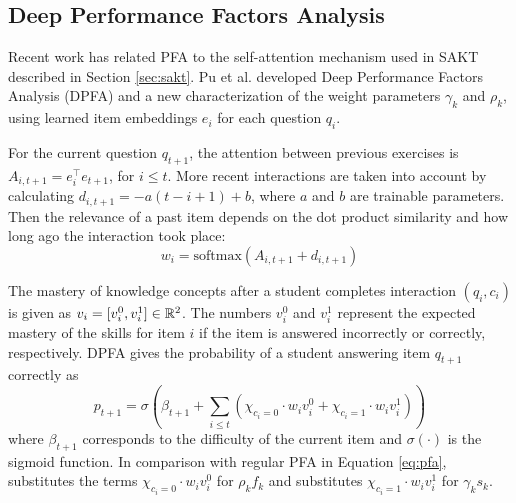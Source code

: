 \subsection{Deep Performance Factors Analysis}
Recent work has related PFA to the self-attention mechanism used in SAKT described in Section \ref{sec:sakt}. Pu et al. \cite{deep_pfa} developed Deep Performance Factors Analysis (DPFA) and a new characterization of the weight parameters $\gamma_k$ and $\rho_k$, using learned item embeddings $e_i$ for each question $q_i$.

For the current question $q_{t+1}$, the attention between previous exercises is $A_{i,t+1} = e_i^\top e_{t+1}$, for $i \leq t$. More recent interactions are taken into account by calculating $d_{i,t+1} = -a(t-i+1)+b$, where $a$ and $b$ are trainable parameters. Then the relevance of a past item depends on the dot product similarity and how long ago the interaction took place:
\begin{equation}
  w_i = \text{softmax}(A_{i,t+1} + d_{i,t+1})
  \label{eq:time_bias_attn}
\end{equation}

The mastery of knowledge concepts after a student completes interaction $(q_i, c_i)$ is given as $v_i = [v_i^0, v_i^1] \in \mathbb{R}^2$. The numbers $v_i^0$ and $v_i^1$ represent the expected mastery of the skills for item $i$ if the item is answered incorrectly or correctly, respectively. DPFA gives the probability of a student answering item $q_{t+1}$ correctly as
\begin{equation}
  p_{t+1} = \sigma\left( \beta_{t+1} + \sum_{i \leq t} \left( \chi_{c_i=0}\cdot w_i v_i^0 + \chi_{c_i=1} \cdot w_i v_i^1 \right) \right)
  \label{eq:dpfa}
\end{equation}
where $\beta_{t+1}$ corresponds to the difficulty of the current item and $\sigma(\cdot)$ is the sigmoid function. In comparison with regular PFA in Equation \ref{eq:pfa}, substitutes the terms $\chi_{c_i=0}\cdot w_i v_i^0$ for $\rho_k f_k$ and substitutes $\chi_{c_i=1} \cdot w_i v_i^1$ for $\gamma_k s_k$.
